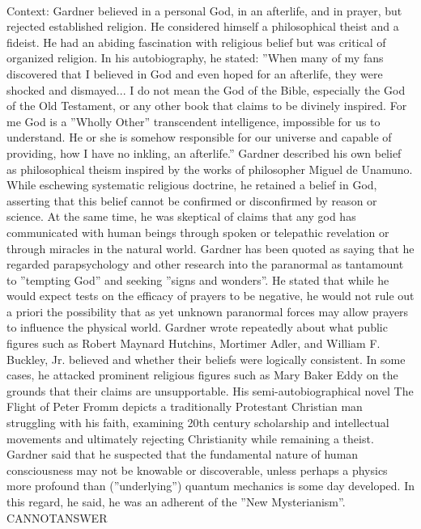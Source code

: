 \documentclass[11pt,a4paper, onecolumn]{article}
\begin{document}
\\ Context: Gardner believed in a personal God, in an afterlife, and in prayer, but rejected established religion. He considered himself a philosophical theist and a fideist. He had an abiding fascination with religious belief but was critical of organized religion. In his autobiography, he stated: ''When many of my fans discovered that I believed in God and even hoped for an afterlife, they were shocked and dismayed... I do not mean the God of the Bible, especially the God of the Old Testament, or any other book that claims to be divinely inspired. For me God is a ''Wholly Other'' transcendent intelligence, impossible for us to understand. He or she is somehow responsible for our universe and capable of providing, how I have no inkling, an afterlife.'' Gardner described his own belief as philosophical theism inspired by the works of philosopher Miguel de Unamuno. While eschewing systematic religious doctrine, he retained a belief in God, asserting that this belief cannot be confirmed or disconfirmed by reason or science. At the same time, he was skeptical of claims that any god has communicated with human beings through spoken or telepathic revelation or through miracles in the natural world. Gardner has been quoted as saying that he regarded parapsychology and other research into the paranormal as tantamount to ''tempting God'' and seeking ''signs and wonders''. He stated that while he would expect tests on the efficacy of prayers to be negative, he would not rule out a priori the possibility that as yet unknown paranormal forces may allow prayers to influence the physical world. Gardner wrote repeatedly about what public figures such as Robert Maynard Hutchins, Mortimer Adler, and William F. Buckley, Jr. believed and whether their beliefs were logically consistent. In some cases, he attacked prominent religious figures such as Mary Baker Eddy on the grounds that their claims are unsupportable. His semi-autobiographical novel The Flight of Peter Fromm depicts a traditionally Protestant Christian man struggling with his faith, examining 20th century scholarship and intellectual movements and ultimately rejecting Christianity while remaining a theist. Gardner said that he suspected that the fundamental nature of human consciousness may not be knowable or discoverable, unless perhaps a physics more profound than (''underlying'') quantum mechanics is some day developed. In this regard, he said, he was an adherent of the ''New Mysterianism''. CANNOTANSWER
\end{document}
